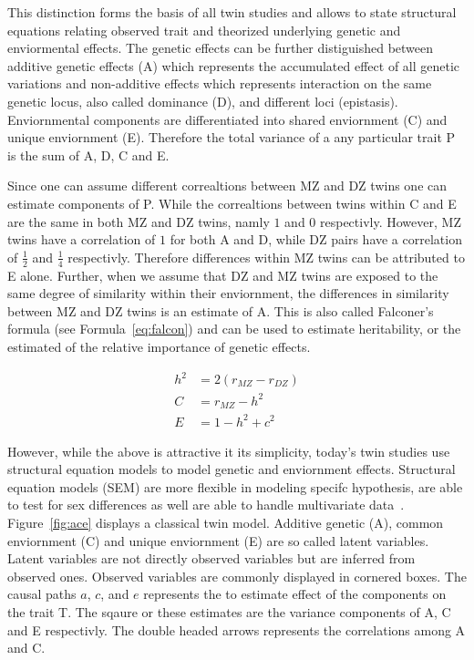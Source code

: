 This distinction forms the basis of all twin studies and allows to state structural equations relating observed trait and theorized underlying genetic and enviormental effects.
The genetic effects can be further distiguished between additive genetic effects (A) which represents the accumulated effect of all genetic variations and non-additive effects which represents interaction on the same genetic locus, also called dominance (D), and different loci (epistasis).
Enviornmental components are differentiated into shared enviornment (C) and unique enviornment (E).
Therefore the total variance of a any particular trait P is the sum of A, D, C and E.

Since one can assume different correaltions between MZ and DZ twins one can estimate components of P.
While the correaltions between twins within C and E are the same in both MZ and DZ twins, namly $1$ and $0$ respectivly.
However, MZ twins have a correlation of $1$ for both A and D, while DZ pairs have a correlation of $\frac{1}{2}$ and $\frac{1}{4}$ respectivly.
Therefore differences within MZ twins can be attributed to E alone.
Further, when we assume that DZ and MZ twins are exposed to the same degree of similarity within their enviornment, the differences in similarity between MZ and DZ twins is an estimate of A.
This is also called Falconer's formula (see Formula~\ref{eq:falcon}) and can be used to estimate heritability, or the estimated of the relative importance of genetic effects.

\begin{align}
  h^2 &= 2(r_{MZ}-r_{DZ})\label{eq:falcon} \\ 
  C &= r_{MZ} - h^2 \nonumber \\
  E &= 1 - h^2 + c^2 \nonumber 
\end{align}

However, while the above is attractive it its simplicity, today's twin studies use structural equation models to model genetic and enviornment effects.
Structural equation models (SEM) are more flexible in modeling specifc hypothesis, are able to test for sex differences as well are able to handle multivariate data~\cite{Rijsdijk2002}.
Figure~\ref{fig:ace} displays a classical twin model.
Additive genetic (A), common enviornment (C) and unique enviornment (E) are so called latent variables.
Latent variables are not directly observed variables but are inferred from observed ones.
Observed variables are commonly displayed in cornered boxes.
The causal paths $a$, $c$, and $e$ represents the to estimate effect of the components on the trait T.
The sqaure or these estimates are the variance components of A, C and E respectivly.
The double headed arrows represents the correlations among A and C.


